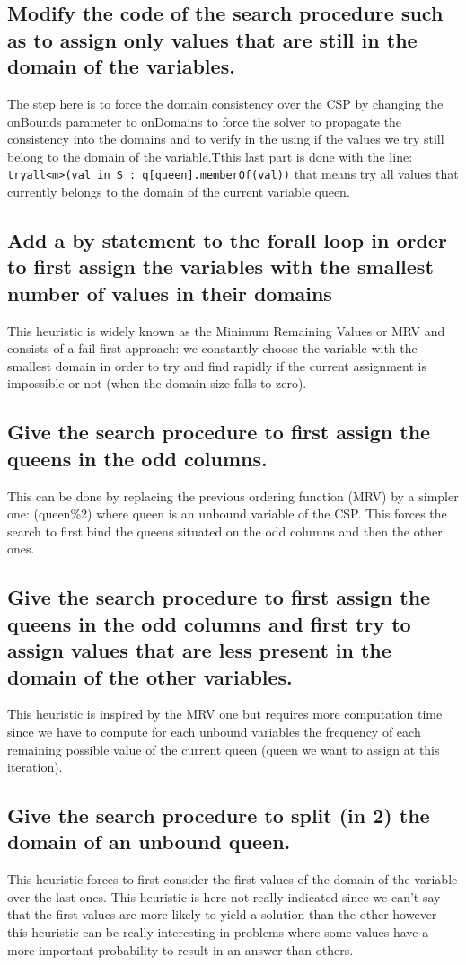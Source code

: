 \documentclass[a4paper ,12pt,french]{article}
\begin{document}
\subsection{Modify the code of the search procedure such as to assign only values that are still in the domain of the variables.}
The step here is to force the domain consistency over the CSP by changing the onBounds parameter to onDomains to force the solver to propagate the consistency into the domains and to verify in the using if the values we try still belong to the domain of the variable.Tthis last part is done with the line: \texttt{tryall<m>(val in S : q[queen].memberOf(val))} that means try all values that currently belongs to the domain of the current variable queen.
\subsection{Add a by statement to the forall loop in order to first assign the variables with the smallest number of values in their domains}
This heuristic is widely known as the Minimum Remaining Values or MRV and consists of a fail first approach: we constantly choose the variable with the smallest domain in order to try and find rapidly if the current assignment is impossible or not (when the domain size falls to zero). 
\subsection{Give the search procedure to first assign the queens in the odd columns.}
This can be done by replacing the previous ordering function (MRV) by a simpler one: (queen\%2) where queen is an unbound variable of the CSP. This forces the search to first bind the queens situated on the odd columns and then the other ones. 
\subsection{Give the search procedure to first assign the queens in the odd columns and first try to assign values that are less present in the domain of the other variables.}
This heuristic is inspired by the MRV one but requires more computation time since we have to compute for each unbound variables the frequency of each remaining possible value of the current queen (queen we want to assign at this iteration).
\subsection{Give the search procedure to split (in 2) the domain of an unbound queen.}
This heuristic forces to first consider the first values of the domain of the variable over the last ones. This heuristic is here not really indicated since we can't say that the first values are more likely to yield a solution than the other however this heuristic can be really interesting in problems where some values have a more important probability to result in an answer than others.
\end{document}
